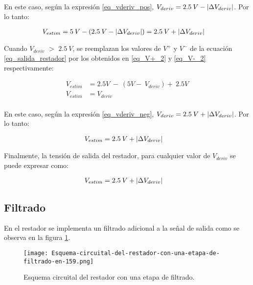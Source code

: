 En este caso,  según la expresión \ref{eq_vderiv_pos}, $V_{deriv} = 2.5\:V - \lvert\Delta V_{deriv}\rvert$. Por lo tanto:

\begin{equation*} 
	\begin{aligned}
		V_{estim}&=5\:V -(2.5\:V - \lvert\Delta V_{deriv}\rvert) = 2.5\:V + \lvert\Delta V_{deriv}\rvert		
	\end{aligned}
\end{equation*}

Cuando $V_{deriv}$ $\mathrm{>}$ $2.5\:V$, se reemplazan los valores de $V^+$ y $V^-$ de la ecuación \ref{eq_salida_restador} por los obtenidos en \ref{eq_V+_2} y \ref{eq_V-_2} respectivamente:

\begin{equation*} 
	\begin{aligned}
		V_{estim}&=2.5V\ -\ (5V-\ V_{deriv})+\ 2.5V\\
		V_{estim}&=V_{deriv}\\
	\end{aligned}
\end{equation*}

En este caso,  según la expresión \ref{eq_vderiv_neg}, $V_{deriv} = 2.5\:V + \lvert\Delta V_{deriv}\rvert$. Por lo tanto:

\begin{equation*} 
	\begin{aligned}
		V_{estim}&=2.5\:V + \lvert\Delta V_{deriv}\rvert		
	\end{aligned}
\end{equation*}

Finalmente, la tensión de salida del restador, para cualquier valor de $V_{deriv}$ se puede expresar como:

\begin{equation*} 
	\begin{aligned}
		V_{estim}&=2.5\:V + \lvert\Delta V_{deriv}\rvert		
	\end{aligned}
\end{equation*}

\subsection{Filtrado}

En el restador se implementa un filtrado adicional a la señal de salida como se observa en la figura  \ref{fig:img_Esquema-circuital-del-restador-con-una-etapa-de-filtrado-en-159}. 

\begin{figure}[H]
	\centering
	\texttt{[image: Esquema-circuital-del-restador-con-una-etapa-de-filtrado-en-159.png]}
	\caption{Esquema circuital del restador con una etapa de filtrado.}
	\label{fig:img_Esquema-circuital-del-restador-con-una-etapa-de-filtrado-en-159}
\end{figure}

